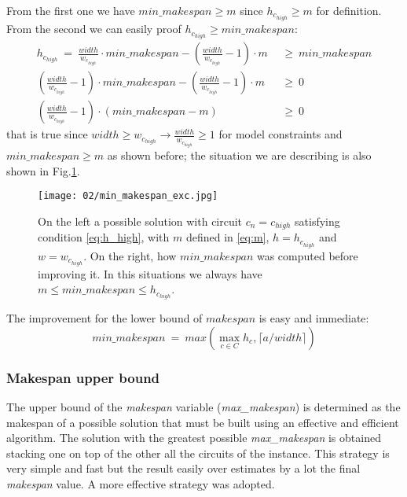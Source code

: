         From the first one we have $min\_makespan \geq m$ since $h_{c_{high}} \geq m$ for definition.
        From the second we can easily proof $h_{c_{high}} \geq min\_makespan$:
        \begin{align*}
            h_{c_{high}}\ =\ \frac{width}{w_{c_{high}}} \cdot min\_makespan - \left( \frac{width}{w_{c_{high}}} - 1\right) \cdot m\ &\ \geq\ min\_makespan       \\
            \left( \frac{width}{w_{c_{high}}} - 1\right) \cdot min\_makespan - \left( \frac{width}{w_{c_{high}}} - 1\right) \cdot m\ &\ \geq\ 0 \\
            \left( \frac{width}{w_{c_{high}}} - 1\right) \cdot \left(min\_makespan - m\right) \ &\ \geq\ 0
        \end{align*}
        that is true since $width \geq w_{c_{high}} \rightarrow \frac{width}{w_{c_{high}}} \geq 1$ for model constraints and $min\_makespan \geq m$ as shown before;
        the situation we are describing is also shown in Fig.\ref{fig:min_makespan}. 

        \begin{figure}[H]
            \centering
            \texttt{[image: 02/min\_makespan\_exc.jpg]}
            \caption{
                On the left a possible solution with circuit $c_n=c_{high}$ satisfying condition \ref{eq:h_high}, 
                with $m$ defined in \ref{eq:m}, $h = h_{c_{high}}$ and $w = w_{c_{high}}$. On the right, how $min\_makespan$ 
                was computed before improving it. In this situations we always have $m \leq min\_makespan \leq h_{c_{high}}$.
            }
            \label{fig:min_makespan}
        \end{figure}
        
        The improvement for the lower bound of $makespan$ is easy and immediate:
        \begin{equation*}
            min\_makespan\ =\ max\left(\max_{c \in C} h_c, \lceil a / width \rceil\right)
        \end{equation*}

    \subsubsection{Makespan upper bound}
        The upper bound of the \textit{makespan} variable (\textit{max\_makespan}) is determined as the makespan of a possible 
        solution that must be built using an effective and efficient algorithm. 
        The solution with the greatest possible \textit{max\_makespan} is obtained stacking one on top of the other all the circuits
        of the instance. This strategy is very simple and fast but the result easily over estimates by a lot the final 
        \textit{makespan} value. A more effective strategy was adopted. \\
        
